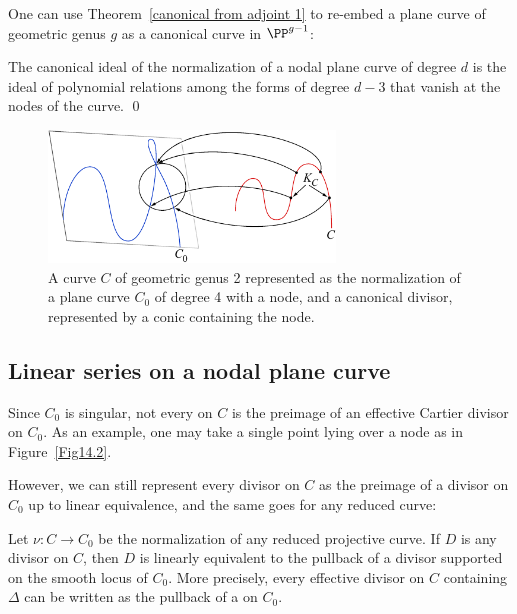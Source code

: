 One can use Theorem~\ref{canonical from adjoint 1} to re-embed a plane
curve of
geometric genus $g$ as a 
canonical curve 
%
in $\PP^{g-1}$:

\begin{corollary}
 The canonical ideal of the normalization of a nodal plane curve of
 degree $d$ is the ideal of polynomial relations
 among the forms of degree $d-3$ that vanish at the nodes of the
 curve. \qed
\end{corollary}

\begin{figure}
\centerline {\includegraphics[width=3in]{"main/Fig14-2"}}
\caption{A curve $C$ of geometric genus 2 represented as the normalization
of a plane curve $C_{0}$ of degree 4 with a node, and a canonical divisor,
represented by a conic containing the node.}
\label{canonical on normalization}
\end{figure}

\subsection{Linear series on a nodal plane curve}
\label{linear series on nodal plane curves}

Since $C_{0}$ is singular, not every 
%
on $C$ is the
preimage of an
effective Cartier divisor on $C_{0}$. As an example, one may take a
single point lying over a node
as in Figure~\ref{Fig14.2}.

However,
we can still represent every divisor on $C$ as the preimage of a divisor
on $C_{0}$ up to linear
equivalence, and the same goes for any reduced curve:

\begin{lemma}
Let $\nu: C\to C_{0}$ be the normalization of any reduced projective
%
curve. If $D$ is any divisor
on $C$, then $D$ is linearly equivalent to the pullback of a divisor
supported on the smooth locus of  $C_{0}$. More precisely,  every
effective divisor on $C$ containing $\Delta$ can be written as the
pullback
of a 
%
on $C_{0}$.
\unif
\end{lemma}

